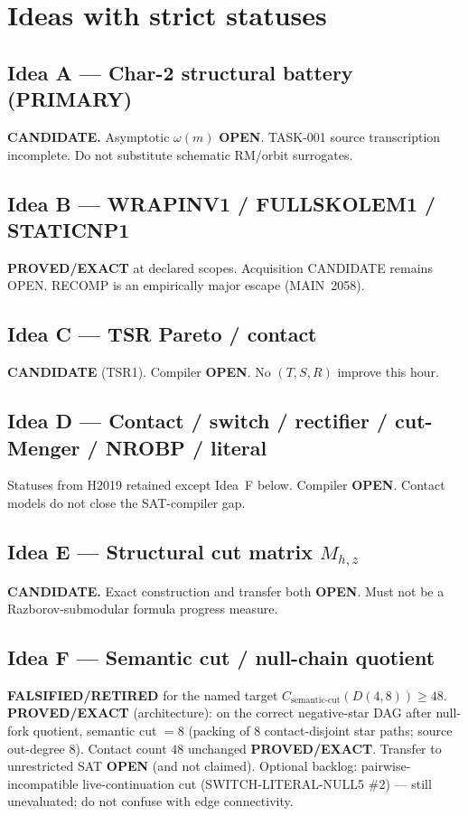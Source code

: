 \documentclass[11pt]{article}
\begin{document}
\section*{Ideas with strict statuses}
\subsection*{Idea A --- Char-2 structural battery (PRIMARY)}
\textbf{CANDIDATE.} Asymptotic $\omega(m)$ \textbf{OPEN}. TASK-001 source transcription incomplete.
Do not substitute schematic RM/orbit surrogates.

\subsection*{Idea B --- WRAPINV1 / FULLSKOLEM1 / STATICNP1}
\textbf{PROVED/EXACT} at declared scopes. Acquisition CANDIDATE remains OPEN.
RECOMP is an empirically major escape (MAIN~2058).

\subsection*{Idea C --- TSR Pareto / contact}
\textbf{CANDIDATE} (TSR1). Compiler \textbf{OPEN}. No $(T,S,R)$ improve this hour.

\subsection*{Idea D --- Contact / switch / rectifier / cut-Menger / NROBP / literal}
Statuses from H2019 retained except Idea~F below.
Compiler \textbf{OPEN}. Contact models do not close the SAT-compiler gap.

\subsection*{Idea E --- Structural cut matrix $M_{h,z}$}
\textbf{CANDIDATE.} Exact construction and transfer both \textbf{OPEN}.
Must not be a Razborov-submodular formula progress measure.

\subsection*{Idea F --- Semantic cut / null-chain quotient}
\textbf{FALSIFIED/RETIRED} for the named target $C_{\mathrm{semantic\textrm{-}cut}}(D(4,8))\ge48$.
\textbf{PROVED/EXACT} (architecture): on the correct negative-star DAG after null-fork quotient,
semantic cut $=8$ (packing of $8$ contact-disjoint star paths; source out-degree $8$).
Contact count $48$ unchanged \textbf{PROVED/EXACT}.
Transfer to unrestricted SAT \textbf{OPEN} (and not claimed).
Optional backlog: pairwise-incompatible live-continuation cut (SWITCH-LITERAL-NULL5 \#2) --- still unevaluated; do not confuse with edge connectivity.
\end{document}
